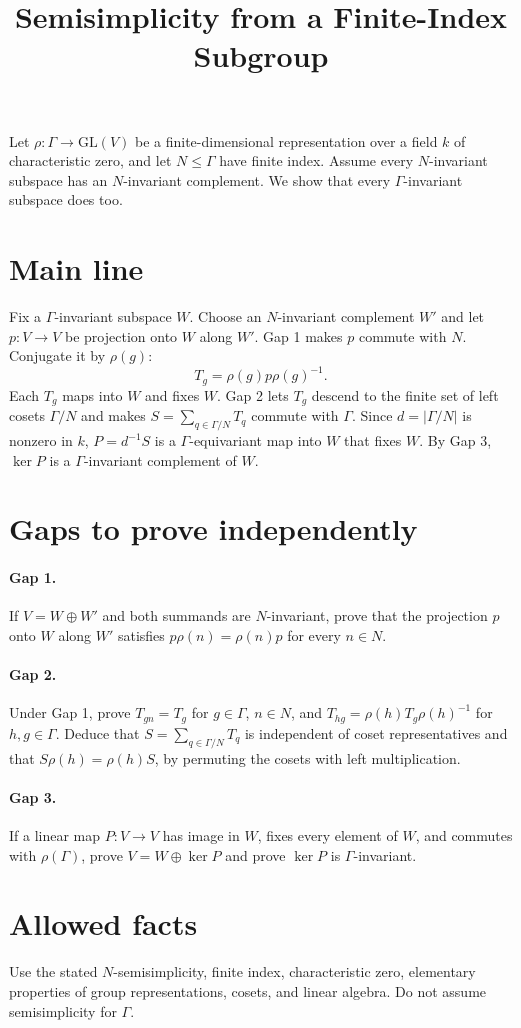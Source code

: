 \documentclass[11pt]{article}
\title{Semisimplicity from a Finite-Index Subgroup}
\author{}
\date{}
\begin{document}
\maketitle

Let $\rho:\Gamma\to\mathrm{GL}(V)$ be a finite-dimensional representation
over a field $k$ of characteristic zero, and let $N\leq\Gamma$ have finite
index. Assume every $N$-invariant subspace has an $N$-invariant complement.
We show that every $\Gamma$-invariant subspace does too.

\section*{Main line}

Fix a $\Gamma$-invariant subspace $W$. Choose an $N$-invariant complement
$W'$ and let $p:V\to V$ be projection onto $W$ along $W'$. Gap 1 makes $p$
commute with $N$. Conjugate it by $\rho(g)$:
\[
  T_g=\rho(g)p\rho(g)^{-1}.
\]
Each $T_g$ maps into $W$ and fixes $W$. Gap 2 lets $T_g$ descend to the
finite set of left cosets $\Gamma/N$ and makes
$S=\sum_{q\in\Gamma/N}T_q$ commute with $\Gamma$. Since
$d=|\Gamma/N|$ is nonzero in $k$, $P=d^{-1}S$ is a
$\Gamma$-equivariant map into $W$ that fixes $W$. By Gap 3,
$\ker P$ is a $\Gamma$-invariant complement of $W$.

\section*{Gaps to prove independently}

\paragraph{Gap 1.}
If $V=W\oplus W'$ and both summands are $N$-invariant, prove that the
projection $p$ onto $W$ along $W'$ satisfies
$p\rho(n)=\rho(n)p$ for every $n\in N$.

\paragraph{Gap 2.}
Under Gap 1, prove $T_{gn}=T_g$ for $g\in\Gamma$, $n\in N$, and
$T_{hg}=\rho(h)T_g\rho(h)^{-1}$ for $h,g\in\Gamma$. Deduce that
$S=\sum_{q\in\Gamma/N}T_q$ is independent of coset representatives and
that $S\rho(h)=\rho(h)S$, by permuting the cosets with left multiplication.

\paragraph{Gap 3.}
If a linear map $P:V\to V$ has image in $W$, fixes every element of $W$,
and commutes with $\rho(\Gamma)$, prove $V=W\oplus\ker P$ and prove
$\ker P$ is $\Gamma$-invariant.

\section*{Allowed facts}

Use the stated $N$-semisimplicity, finite index, characteristic zero,
elementary properties of group representations, cosets, and linear algebra.
Do not assume semisimplicity for $\Gamma$.
\end{document}
